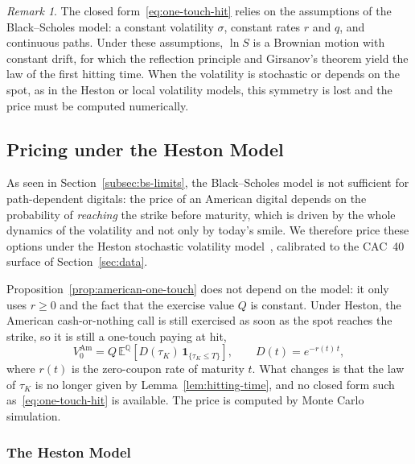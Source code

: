 \documentclass[11pt,a4paper]{article}
\theoremstyle{remark}
\newtheorem{remark}{Remark}[section]
\newcommand{\E}{\mathbb{E}}
\newcommand{\Q}{\mathbb{Q}}
\newcommand{\ind}{\mathbf{1}}
\begin{document}
\begin{remark}
The closed form~\eqref{eq:one-touch-hit} relies on the assumptions of the
Black--Scholes model: a constant volatility $\sigma$, constant rates $r$ and
$q$, and continuous paths. Under these assumptions, $\ln S$ is a Brownian
motion with constant drift, for which the reflection principle and Girsanov's
theorem yield the law of the first hitting time. When the volatility is
stochastic or depends on the spot, as in the Heston or local volatility
models, this symmetry is lost and the price must be computed numerically.
\end{remark}


\subsection{Pricing under the Heston Model}
\label{subsec:heston-american}

As seen in Section~\ref{subsec:bs-limits}, the Black--Scholes model is not
sufficient for path-dependent digitals: the price of an American digital
depends on the probability of \emph{reaching} the strike before maturity, which
is driven by the whole dynamics of the volatility and not only by today's
smile. We therefore price these options under the Heston stochastic volatility
model~\cite{Heston1993}, calibrated to the CAC~40 surface of
Section~\ref{sec:data}.

Proposition~\ref{prop:american-one-touch} does not depend on the model: it only
uses $r \geq 0$ and the fact that the exercise value $Q$ is constant. Under
Heston, the American cash-or-nothing call is still exercised as soon as the
spot reaches the strike, so it is still a one-touch paying at hit,
\begin{equation}
  V^{\mathrm{Am}}_0 = Q\,\E^{\Q}\!\left[D(\tau_K)\,\ind_{\{\tau_K \leq T\}}\right],
  \qquad D(t) = e^{-r(t)\,t},
  \label{eq:heston-american}
\end{equation}
where $r(t)$ is the zero-coupon rate of maturity $t$. What changes is that the
law of $\tau_K$ is no longer given by Lemma~\ref{lem:hitting-time}, and no
closed form such as~\eqref{eq:one-touch-hit} is available. The price is
computed by Monte Carlo simulation.

\subsubsection{The Heston Model}
\end{document}
